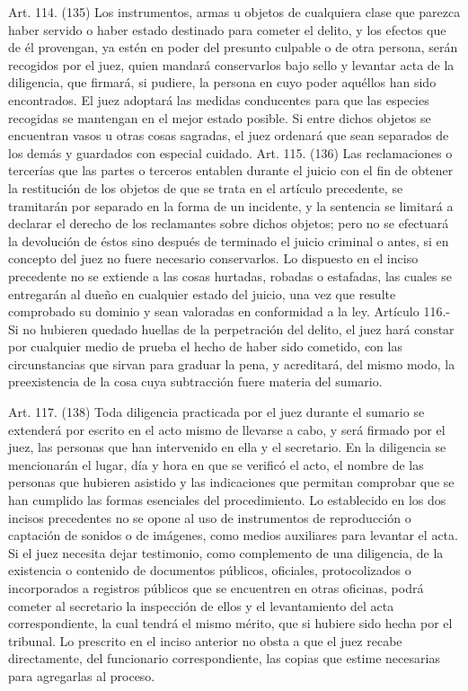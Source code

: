     Art. 114. (135) Los instrumentos, armas u objetos de cualquiera clase que parezca haber servido o haber estado destinado para cometer el delito, y los efectos que de él provengan, ya estén en poder del presunto culpable o de otra persona, serán recogidos por el juez, quien mandará conservarlos bajo sello y levantar acta de la diligencia, que firmará, si pudiere, la persona en cuyo poder aquéllos han sido encontrados.
    El juez adoptará las medidas conducentes para que las especies recogidas se mantengan en el mejor estado posible.
    Si entre dichos objetos se encuentran vasos u otras cosas sagradas, el juez ordenará que sean separados de los demás y guardados con especial cuidado.
    Art. 115. (136) Las reclamaciones o tercerías que las partes o terceros entablen durante el juicio con el fin de obtener la restitución de los objetos de que se trata en el artículo precedente, se tramitarán por separado en la forma de un incidente, y la sentencia se limitará a declarar el derecho de los reclamantes sobre dichos objetos; pero no se efectuará la devolución de éstos sino después de terminado el juicio criminal o antes, si en concepto del juez no fuere necesario conservarlos.
    Lo dispuesto en el inciso precedente no se extiende a las cosas hurtadas, robadas o estafadas, las cuales se entregarán al dueño en cualquier estado del juicio, una vez que resulte comprobado su dominio y sean valoradas en conformidad a la ley.
    Artículo 116.- Si no hubieren quedado huellas de la perpetración del delito, el juez hará constar por cualquier medio de prueba el hecho de haber sido cometido, con las circunstancias que sirvan para graduar la pena, y acreditará, del mismo modo, la preexistencia de la cosa cuya subtracción fuere materia del sumario.

    Art. 117. (138) Toda diligencia practicada por el juez durante el sumario se extenderá por escrito en el acto mismo de llevarse a cabo, y será firmado por el juez, las personas que han intervenido en ella y el secretario.
    En la diligencia se mencionarán el lugar, día y hora en que se verificó el acto, el nombre de las personas que hubieren asistido y las indicaciones que permitan comprobar que se han cumplido las formas esenciales del procedimiento.
    Lo establecido en los dos incisos precedentes no se opone al uso de instrumentos de reproducción o captación de sonidos o de imágenes, como medios auxiliares para levantar el acta.
    Si el juez necesita dejar testimonio, como complemento de una diligencia, de la existencia o contenido de documentos públicos, oficiales, protocolizados o incorporados a registros públicos que se encuentren en otras oficinas, podrá cometer al secretario la inspección de ellos y el levantamiento del acta correspondiente, la cual tendrá el mismo mérito, que si hubiere sido hecha por el tribunal.
    Lo prescrito en el inciso anterior no obsta a que el juez recabe directamente, del funcionario correspondiente, las copias que estime necesarias para agregarlas al proceso.

